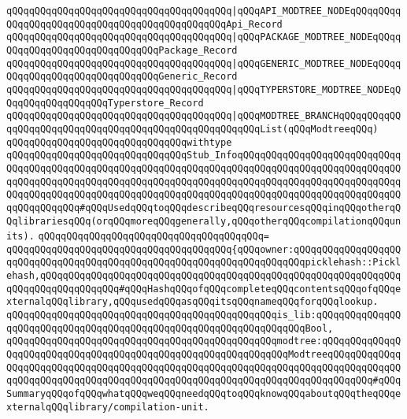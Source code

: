 \verb|qQQqqQQqqQQqqQQqqQQqqQQqqQQqqQQqqQQqqQQq|\verb#|qQQqAPI_MODTREE_NODEqQQqqQQqqQQqqQQqqQQqqQQqqQQqqQQqqQQqqQQqqQQqqQQqApi_Record#\newline
\verb|qQQqqQQqqQQqqQQqqQQqqQQqqQQqqQQqqQQqqQQq|\verb#|qQQqPACKAGE_MODTREE_NODEqQQqqQQqqQQqqQQqqQQqqQQqqQQqqQQqPackage_Record#\newline
\verb|qQQqqQQqqQQqqQQqqQQqqQQqqQQqqQQqqQQqqQQq|\verb#|qQQqGENERIC_MODTREE_NODEqQQqqQQqqQQqqQQqqQQqqQQqqQQqqQQqGeneric_Record#\newline
\verb|qQQqqQQqqQQqqQQqqQQqqQQqqQQqqQQqqQQqqQQq|\verb#|qQQqTYPERSTORE_MODTREE_NODEqQQqqQQqqQQqqQQqqQQqTyperstore_Record#\newline
\verb|qQQqqQQqqQQqqQQqqQQqqQQqqQQqqQQqqQQqqQQq|\verb#|qQQqMODTREE_BRANCHqQQqqQQqqQQqqQQqqQQqqQQqqQQqqQQqqQQqqQQqqQQqqQQqqQQqqQQqList(qQQqModtreeqQQq)#\newline
\newline
\newline
\newline
\verb|qQQqqQQqqQQqqQQqqQQqqQQqqQQqqQQqwithtype|\newline
\verb|qQQqqQQqqQQqqQQqqQQqqQQqqQQqqQQqStub_InfoqQQqqQQqqQQqqQQqqQQqqQQqqQQqqQQqqQQqqQQqqQQqqQQqqQQqqQQqqQQqqQQqqQQqqQQqqQQqqQQqqQQqqQQqqQQqqQQqqQQqqQQqqQQqqQQqqQQqqQQqqQQqqQQqqQQqqQQqqQQqqQQqqQQqqQQqqQQqqQQqqQQqqQQqqQQqqQQqqQQqqQQqqQQqqQQqqQQqqQQqqQQqqQQqqQQqqQQqqQQqqQQqqQQqqQQqqQQqqQQqqQQqqQQqqQQq#qQQqUsedqQQqtoqQQqdescribeqQQqresourcesqQQqinqQQqotherqQQqlibrariesqQQq(orqQQqmoreqQQqgenerally,qQQqotherqQQqcompilationqQQqunits).|\newline
\verb|qQQqqQQqqQQqqQQqqQQqqQQqqQQqqQQqqQQqqQQq=|\newline
\verb|qQQqqQQqqQQqqQQqqQQqqQQqqQQqqQQqqQQqqQQq{qQQqowner:qQQqqQQqqQQqqQQqqQQqqQQqqQQqqQQqqQQqqQQqqQQqqQQqqQQqqQQqqQQqqQQqqQQqqQQqpicklehash::Picklehash,qQQqqQQqqQQqqQQqqQQqqQQqqQQqqQQqqQQqqQQqqQQqqQQqqQQqqQQqqQQqqQQqqQQqqQQqqQQqqQQqqQQq#qQQqHashqQQqofqQQqcompleteqQQqcontentsqQQqofqQQqexternalqQQqlibrary,qQQqusedqQQqasqQQqitsqQQqnameqQQqforqQQqlookup.|\newline
\verb|qQQqqQQqqQQqqQQqqQQqqQQqqQQqqQQqqQQqqQQqqQQqqQQqis_lib:qQQqqQQqqQQqqQQqqQQqqQQqqQQqqQQqqQQqqQQqqQQqqQQqqQQqqQQqqQQqqQQqqQQqBool,|\newline
\verb|qQQqqQQqqQQqqQQqqQQqqQQqqQQqqQQqqQQqqQQqqQQqqQQqmodtree:qQQqqQQqqQQqqQQqqQQqqQQqqQQqqQQqqQQqqQQqqQQqqQQqqQQqqQQqqQQqqQQqModtreeqQQqqQQqqQQqqQQqqQQqqQQqqQQqqQQqqQQqqQQqqQQqqQQqqQQqqQQqqQQqqQQqqQQqqQQqqQQqqQQqqQQqqQQqqQQqqQQqqQQqqQQqqQQqqQQqqQQqqQQqqQQqqQQqqQQqqQQqqQQqqQQqqQQq#qQQqSummaryqQQqofqQQqwhatqQQqweqQQqneedqQQqtoqQQqknowqQQqaboutqQQqtheqQQqexternalqQQqlibrary/compilation-unit.|\newline

